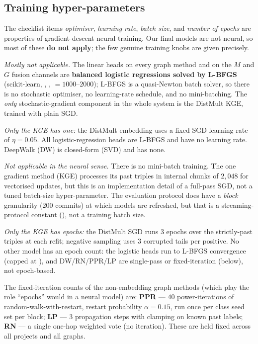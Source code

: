 	\subsection{Training hyper-parameters}
	\label{sec:setup-hparams}
	The checklist items \emph{optimiser}, \emph{learning rate}, \emph{batch size}, and
	\emph{number of epochs} are properties of gradient-descent neural training. Our final
	models are not neural, so most of these \textbf{do not apply}; the few genuine
	training knobs are given precisely.

	\begin{description}[leftmargin=1.4em]
		\item[Optimiser.] \emph{Mostly not applicable.} The linear heads on every graph
		method and on the $M$ and $G$ fusion channels are \textbf{balanced logistic
		regressions solved by L-BFGS} (scikit-learn, ,
		, $=1000$--$2000$); L-BFGS is a
		quasi-Newton batch solver, so there is no stochastic optimiser, no learning-rate
		schedule, and no mini-batching. The \emph{only} stochastic-gradient component in the
		whole system is the DistMult KGE, trained with plain SGD.
		\item[Learning rate.] \emph{Only the KGE has one:} the DistMult embedding uses a
		fixed SGD learning rate of $\eta=0.05$. All logistic-regression heads are L-BFGS and
		have no learning rate. DeepWalk (DW) is closed-form (SVD) and has none.
		\item[Batch size.] \emph{Not applicable in the neural sense.} There is no
		mini-batch training. The one gradient method (KGE) processes its past triples in
		internal chunks of $2{,}048$ for vectorised updates, but this is an implementation
		detail of a full-pass SGD, not a tuned batch-size hyper-parameter. The evaluation
		protocol does have a \emph{block} granularity ($200$ commits) at which models are
		refreshed, but that is a streaming-protocol constant (),
		not a training batch size.
		\item[Number of epochs.] \emph{Only the KGE has epochs:} the DistMult SGD runs
		$3$ epochs over the strictly-past triples at each refit; negative sampling uses
		$3$ corrupted tails per positive. No other model has an epoch count: the
		logistic heads run to L-BFGS convergence (capped at ), and DW/RN/PPR/LP
		are single-pass or fixed-iteration (below), not epoch-based.
	\end{description}

	\noindent The fixed-iteration counts of the non-embedding graph methods (which play the
	role ``epochs'' would in a neural model) are: \textbf{PPR} --- $40$ power-iterations of
	random-walk-with-restart, restart probability $\alpha=0.15$, run once per class seed set
	per block; \textbf{LP} --- $3$ propagation steps with clamping on known past labels;
	\textbf{RN} --- a single one-hop weighted vote (no iteration). These are held fixed
	across all projects and all graphs.


